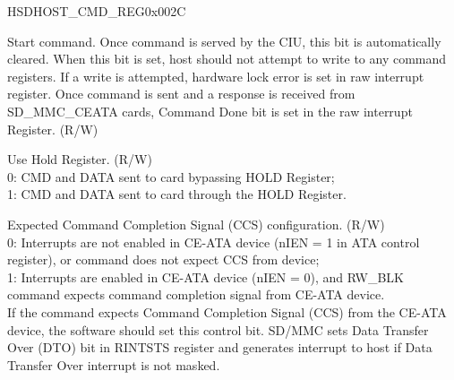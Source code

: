 \begin{register}{H}{SDHOST\_CMD\_REG}{0x{}002C}\label{regdesc:CMDREG}
%
%
%
%
%
%
%
%
%
%
%
%
%
%
%
%
%
%
%
%
%
%
%
\regnewline%
\begin{regdesc}\begin{reglist}
\item [SDHOST\_START\_CMD]Start command. Once command is served by the CIU, this bit is automatically cleared. When this bit is set, host should not attempt to write to any command registers. If a write is attempted, hardware lock error is set in raw interrupt register. Once command is sent and a response is received from SD\_MMC\_CEATA cards, Command Done bit is set in the raw interrupt Register. (R/W)
\item [SDHOST\_USE\_HOLE]Use Hold Register. (R/W) \\
0: CMD and DATA sent to card bypassing HOLD Register; \\
1: CMD and DATA sent to card through the HOLD Register.
\item [SDHOST\_CCS\_EXPECTED] Expected Command Completion Signal (CCS) configuration. (R/W)\\
0: Interrupts are not enabled in CE-ATA device (nIEN = 1 in ATA control register), or command does not expect CCS from device;\\
1: Interrupts are enabled in CE-ATA device (nIEN = 0), and RW\_BLK command expects command completion signal from CE-ATA device.\\
If the command expects Command Completion Signal (CCS) from the CE-ATA device, the software should set this control bit. SD/MMC sets Data Transfer Over (DTO) bit in RINTSTS register and generates interrupt to host if Data Transfer Over interrupt is not masked.

\end{reglist}
\end{regdesc}
\end{register}
